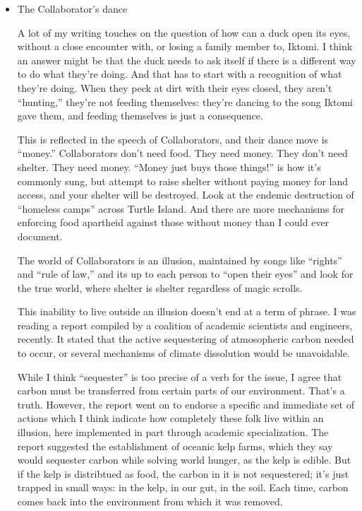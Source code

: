 \documentclass[11pt]{article}
\begin{document}
\begin{itemize}
\begin{itemize}
“Sometimes it’s bright, like when there’s lots of snow on the ground. You’ll get used to it!” the other ducks would encourage. But it’d been so long since they’d seen the snow, with their eyes closed like that, they didn’t know what the other ducks meant. And their songs said their way of life was very comfortable, they didn’t have to get used to anything. So the ducks kept their eyes shut, and in between naps, Iktomi gobbled up as many as he wanted.
\item The Collaborator's dance
\label{sec:orge6da9e7}

A lot of my writing touches on the question of how can a duck open its eyes, without a close encounter with, or losing a family member to, Iktomi. I think an answer might be that the duck needs to ask itself if there is a different way to do what they’re doing. And that has to start with a recognition of what they’re doing. When they peck at dirt with their eyes closed, they aren’t “hunting,” they’re not feeding themselves: they’re dancing to the song Iktomi gave them, and feeding themselves is just a consequence.

This is reflected in the speech of Collaborators, and their dance move is “money.” Collaborators don’t need food. They need money. They don’t need shelter. They need money. “Money just buys those things!” is how it’s commonly sung, but attempt to raise shelter without paying money for land access, and your shelter will be destroyed. Look at the endemic destruction of “homeless camps” across Turtle Island. And there are more mechanisms for enforcing food apartheid against those without money than I could ever document.

The world of Collaborators is an illusion, maintained by songs like “rights” and “rule of law,” and its up to each person to “open their eyes” and look for the true world, where shelter is shelter regardless of magic scrolls.

This inability to live outside an illusion doesn’t end at a term of phrase. I was reading a report compiled by a coalition of academic scientists and engineers, recently. It stated that the active sequestering of atmosopheric carbon needed to occur, or several mechanisms of climate dissolution would be unavoidable.

While I think “sequester” is too precise of a verb for the issue, I agree that carbon must be transferred from certain parts of our environment. That’s a truth. However, the report went on to endorse a specific and immediate set of actions which I think indicate how completely these folk live within an illusion, here implemented in part through academic specialization. The report suggested the establishment of oceanic kelp farms, which they say would sequester carbon while solving world hunger, as the kelp is edible. But if the kelp is distribtued as food, the carbon in it is not sequestered; it’s just trapped in small ways: in the kelp, in our gut, in the soil. Each time, carbon comes back into the environment from which it was removed.


\end{itemize}
\end{itemize}
\end{document}
